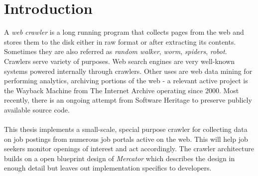 \chapter{Introduction}
A \textit{web crawler} is a long running program that collects pages from the web and stores them to the
disk either in raw format or after extracting its contents. Sometimes they are also referred as
\textit{random walker}, \textit{worm}, \textit{spiders}, \textit{robot}. Crawlers serve variety of
purposes. Web search engines are very well-known systems powered internally through crawlers.
Other uses are web data mining for performing analytics, archiving portions of the web - a
relevant active project is the Wayback Machine from The Internet Archive\cite{netarchive} operating since 2000. Most recently,
there is an ongoing attempt from Software Heritage\cite{swheritage} to preserve publicly available
source code.
\\
\\
This thesis implements a small-scale, special purpose crawler for collecting data on job postings from
numerous job portals active on the web. This will help job seekers monitor openings of interest and
act accordingly. The crawler architecture builds on a open blueprint design of \textit{Mercator}\cite{mercator} which describes the design in enough detail but leaves out implementation specifics to developers.
\\
\\
